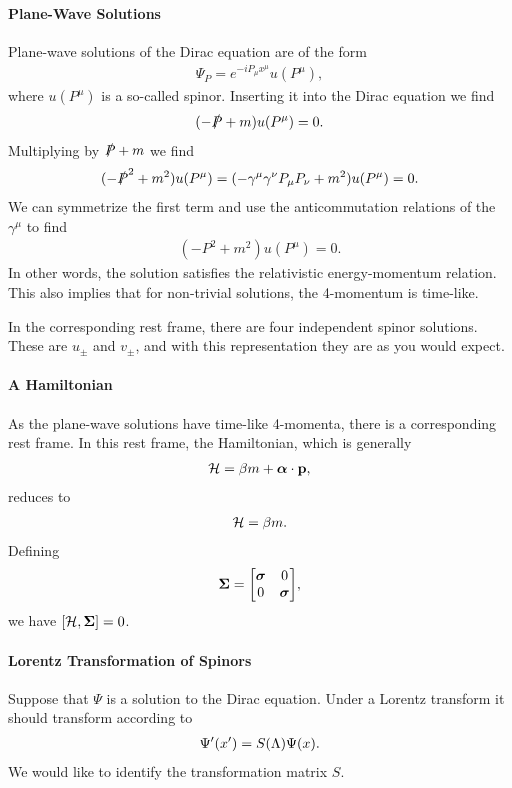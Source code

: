 \paragraph{Plane-Wave Solutions}
Plane-wave solutions of the Dirac equation are of the form
\begin{align*}
	\Psi_{P} = e^{-iP_{\mu}x^{\mu}}u(P^{\mu}),
\end{align*}
where $u(P^{\mu})$ is a so-called spinor. Inserting it into the Dirac equation we find
\begin{align*}
	(-\slashed{P} + m)u(P^{\mu}) = 0.
\end{align*}
Multiplying by $\slashed{P} + m$ we find
\begin{align*}
	(-\slashed{P}^{2} + m^{2})u(P^{\mu}) = (-\gamma^{\mu}\gamma^{\nu}P_{\mu}P_{\nu} + m^{2})u(P^{\mu}) = 0.
\end{align*}
We can symmetrize the first term and use the anticommutation relations of the $\gamma^{\mu}$ to find
\begin{align*}
	(-P^{2} + m^{2})u(P^{\mu}) = 0.
\end{align*}
In other words, the solution satisfies the relativistic energy-momentum relation. This also implies that for non-trivial solutions, the 4-momentum is time-like.

In the corresponding rest frame, there are four independent spinor solutions. These are $u_{\pm}$ and $v_{\pm}$, and with this representation they are as you would expect.

\paragraph{A Hamiltonian}
As the plane-wave solutions have time-like 4-momenta, there is a corresponding rest frame. In this rest frame, the Hamiltonian, which is generally
\begin{align*}
	\mathcal{H} = \beta m + \vb*{\alpha}\cdot\vb{p},
\end{align*}
reduces to
\begin{align*}
	\mathcal{H} = \beta m.
\end{align*}
Defining
\begin{align*}
	\vb*{\Sigma} =
	\mqty[
		\vb*{\sigma} & 0 \\
		0            & \vb*{\sigma}
	],
\end{align*}
we have $\comm{\ham}{\vb*{\Sigma}} = 0$.

\paragraph{Lorentz Transformation of Spinors}
Suppose that $\Psi$ is a solution to the Dirac equation. Under a Lorentz transform it should transform according to
\begin{align*}
	\Psi^{\prime}(x^{\prime}) = S(\Lambda)\Psi(x).
\end{align*}
We would like to identify the transformation matrix $S$.

